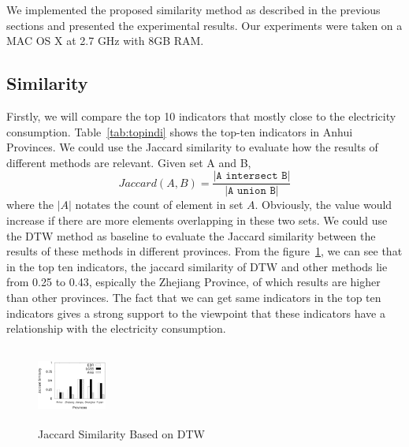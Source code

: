We implemented the proposed similarity method as described in the previous sections and presented the experimental results. Our experiments were taken on a MAC OS X at 2.7 GHz with 8GB RAM.
\subsection{Similarity}
Firstly, we will compare the top 10 indicators that mostly close to the electricity consumption. Table~\ref{tab:topindi} shows the top-ten indicators in Anhui Provinces. We could use the Jaccard similarity to evaluate how the results of different methods are relevant. Given set A and B, 
\begin{equation}
	Jaccard(A, B) = \frac{\texttt{|A intersect B|}}{\texttt{|A union B|}}
\end{equation} 
where the $|A|$ notates the count of element in set $A$. Obviously, the value would increase if there are more elements overlapping in these two sets. We could use the DTW method as baseline to evaluate the Jaccard similarity between the results of these methods in different provinces. From the figure~\ref{fig:Jaccard}, we can see that in the top ten indicators, the jaccard similarity of DTW and other methods lie from 0.25 to 0.43, espically the Zhejiang Province, of which results are higher than other provinces. The fact that we can get same indicators in the top ten indicators gives a strong support to the viewpoint that these indicators have a relationship with the electricity consumption.



%
%

\begin{figure}
	\centering
	\includegraphics[height=1in, width=0.9in]{fig/dtw_jaccard_similarity}
	\caption{Jaccard Similarity Based on DTW}
	\label{fig:Jaccard}
\end{figure}

